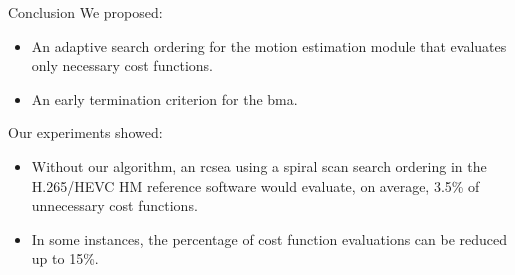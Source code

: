 \documentclass[10pt]{beamer}
\begin{document}
\begin{frame}[t]
\begin{columns}[t, onlytextwidth]
\begin{column}{0.32\textwidth}
        \begin{block}{Conclusion}
            We proposed:
            \begin{itemize}
            \item An adaptive search ordering for the motion estimation module that evaluates only necessary cost functions.
            \item An early termination criterion for the \gls{bma}.
            \end{itemize}
             Our experiments showed:
            \begin{itemize}
            \item  Without our algorithm, an \gls{rcsea} using a spiral scan search ordering in the H.265/HEVC HM reference software would evaluate, on average, 3.5\% of unnecessary cost functions.
            \item In some instances, the percentage of cost function evaluations can be reduced up to 15\%.
            \end{itemize}
        \end{block}
    \end{column}
\end{columns}
\end{frame}
\end{document}
